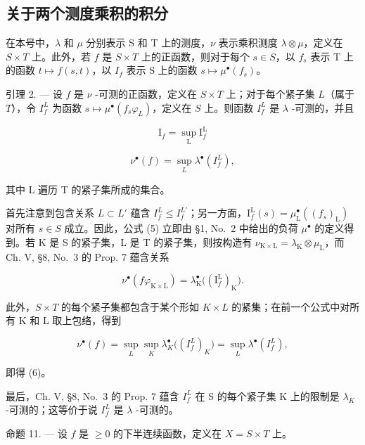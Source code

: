 \subsection{关于两个测度乘积的积分}

在本号中，\(\lambda\) 和 \(\mu\) 分别表示 S 和 T 上的测度，\(\nu\) 表示乘积测度 \(\lambda \otimes \mu\)，定义在 \(S \times T\) 上。此外，若 \(f\) 是 \(S \times T\) 上的正函数，则对于每个 \(s \in S\)，以 \(f_s\) 表示 T 上的函数 \(t \mapsto f(s,t)\)，以 \(I_f\) 表示 S 上的函数 \(s \mapsto \mu^\bullet(f_s)\)。

引理 2. --- 设 \(f\) 是 \(\nu\) -可测的正函数，定义在 \(S \times T\) 上；对于每个紧子集 \(L\)（属于 \(T\)），令 \(I_f^L\) 为函数 \(s \mapsto \mu^\bullet(f_s \varphi_L)\)，定义在 \(S\) 上。则函数 \(I_f^L\) 是 \(\lambda\) -可测的，并且

\[
\mathrm{I} _ {f} = \sup _ {\mathrm{L}} \mathrm{I} _ {f} ^ {\mathrm{L}}\tag{5}
\]

\[
\nu^ {\bullet} (f) = \sup _ {L} \lambda^ {\bullet} (I _ {f} ^ {L}),\tag{6}
\]

其中 L 遍历 T 的紧子集所成的集合。

首先注意到包含关系 \(L \subset L'\) 蕴含 \(I_{f}^{L} \leqslant I_{f}^{L'}\)；另一方面，\(\mathrm{I}_{f}^{\mathrm{L}}(s) = \mu_{\mathrm{L}}^{\bullet}((f_{s})_{\mathrm{L}})\) 对所有 \(s \in S\) 成立。因此，公式 (5) 立即由 §1, No.~2 中给出的负荷 \(\mu^{\bullet}\) 的定义得到。若 K 是 S 的紧子集，L 是 T 的紧子集，则按构造有 \(\nu_{\mathrm{K} \times \mathrm{L}} = \lambda_{\mathrm{K}} \otimes \mu_{\mathrm{L}}\)，而 Ch. V, §8, No.~3 的 Prop. 7 蕴含关系

\[
\nu^ {\bullet} (f \varphi_ {\mathrm{K} \times \mathrm{L}}) = \lambda_ {\mathrm{K}} ^ {\bullet} \big ((\mathrm{I} _ {f} ^ {\mathrm{L}}) _ {\mathrm{K}} \big).\tag{7}
\]

此外，\(S \times T\) 的每个紧子集都包含于某个形如 \(K \times L\) 的紧集；在前一个公式中对所有 K 和 L 取上包络，得到

\[
\nu^ {\bullet} (f) = \sup _ {L} \sup _ {K} \lambda_ {K} ^ {\bullet} \big ((I _ {f} ^ {L}) _ {K} \big) = \sup _ {L} \lambda^ {\bullet} (I _ {f} ^ {L}),\tag{8}
\]

即得 (6)。

最后，Ch. V, §8, No.~3 的 Prop. 7 蕴含 \(I_{f}^{L}\) 在 S 的每个紧子集 K 上的限制是 \(\lambda_{K}\) -可测的；这等价于说 \(I_{f}^{L}\) 是 \(\lambda\) -可测的。

命题 11. --- 设 \(f\) 是 \(\geqslant 0\) 的下半连续函数，定义在 \(X = S \times T\) 上。

